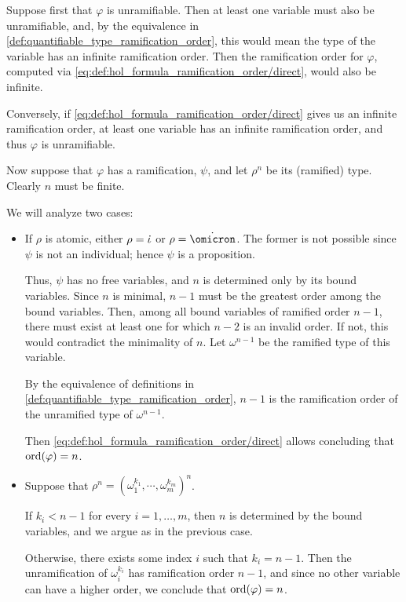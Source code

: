 \begin{defproof}
  Suppose first that \( \varphi \) is unramifiable. Then at least one variable must also be unramifiable, and, by the equivalence in \cref{def:quantifiable_type_ramification_order}, this would mean the type of the variable has an infinite ramification order. Then the ramification order for \( \varphi \), computed via \eqref{eq:def:hol_formula_ramification_order/direct}, would also be infinite.

  Conversely, if \eqref{eq:def:hol_formula_ramification_order/direct} gives us an infinite ramification order, at least one variable has an infinite ramification order, and thus \( \varphi \) is unramifiable.

  Now suppose that \( \varphi \) has a ramification, \( \psi \), and let \( \rho^n \) be its (ramified) type. Clearly \( n \) must be finite.

  We will analyze two cases:
  \begin{itemize}
    \item If \( \rho \) is atomic, either \( \rho = \dot{\iota} \) or \( \rho = \syn\omicron \). The former is not possible since \( \psi \) is not an individual; hence \( \psi \) is a proposition.

    Thus, \( \psi \) has no free variables, and \( n \) is determined only by its bound variables. Since \( n \) is minimal, \( n - 1 \) must be the greatest order among the bound variables. Then, among all bound variables of ramified order \( n - 1 \), there must exist at least one for which \( n - 2 \) is an invalid order. If not, this would contradict the minimality of \( n \). Let \( \omega^{n-1} \) be the ramified type of this variable.

    By the equivalence of definitions in \cref{def:quantifiable_type_ramification_order}, \( n - 1 \) is the ramification order of the unramified type of \( \omega^{n-1} \).

    Then \eqref{eq:def:hol_formula_ramification_order/direct} allows concluding that \( \operatorname{ord}(\varphi) = n \).

    \item Suppose that \( \rho^n = (\omega_1^{k_1}, \cdots, \omega_m^{k_m})^n \).

    If \( k_i < n - 1 \) for every \( i = 1, \ldots, m \), then \( n \) is determined by the bound variables, and we argue as in the previous case.

    Otherwise, there exists some index \( i \) such that \( k_i = n - 1 \). Then the unramification of \( \omega_i^{k_i} \) has ramification order \( n - 1 \), and since no other variable can have a higher order, we conclude that \( \operatorname{ord}(\varphi) = n \).
  \end{itemize}
\end{defproof}

